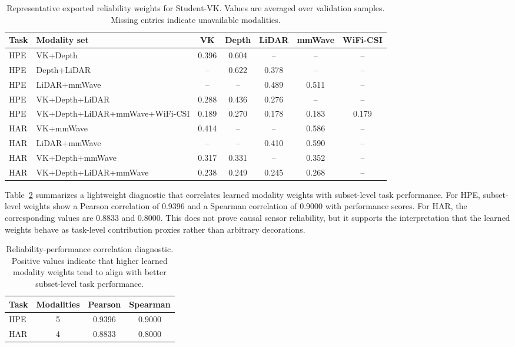 \documentclass[preprint,12pt]{elsarticle}
\begin{document}
\begin{table}[t]
\centering
\caption{Representative exported reliability weights for Student-VK. Values are averaged over validation samples. Missing entries indicate unavailable modalities.}
\label{tab:reliability_examples}
\scriptsize
\begin{adjustbox}{width=\textwidth}
\begin{tabular}{llccccc}
\toprule
Task & Modality set & VK & Depth & LiDAR & mmWave & WiFi-CSI \\
\midrule
HPE & VK+Depth & 0.396 & 0.604 & -- & -- & -- \\
HPE & Depth+LiDAR & -- & 0.622 & 0.378 & -- & -- \\
HPE & LiDAR+mmWave & -- & -- & 0.489 & 0.511 & -- \\
HPE & VK+Depth+LiDAR & 0.288 & 0.436 & 0.276 & -- & -- \\
HPE & VK+Depth+LiDAR+mmWave+WiFi-CSI & 0.189 & 0.270 & 0.178 & 0.183 & 0.179 \\
\midrule
HAR & VK+mmWave & 0.414 & -- & -- & 0.586 & -- \\
HAR & LiDAR+mmWave & -- & -- & 0.410 & 0.590 & -- \\
HAR & VK+Depth+mmWave & 0.317 & 0.331 & -- & 0.352 & -- \\
HAR & VK+Depth+LiDAR+mmWave & 0.238 & 0.249 & 0.245 & 0.268 & -- \\
\bottomrule
\end{tabular}
\end{adjustbox}
\end{table}

Table~\ref{tab:reliability_correlation} summarizes a lightweight diagnostic that correlates learned modality weights with subset-level task performance. For HPE, subset-level weights show a Pearson correlation of 0.9396 and a Spearman correlation of 0.9000 with performance scores. For HAR, the corresponding values are 0.8833 and 0.8000. This does not prove causal sensor reliability, but it supports the interpretation that the learned weights behave as task-level contribution proxies rather than arbitrary decorations.

\begin{table}[t]
\centering
\caption{Reliability-performance correlation diagnostic. Positive values indicate that higher learned modality weights tend to align with better subset-level task performance.}
\label{tab:reliability_correlation}
\begin{tabular}{lccc}
\toprule
Task & Modalities & Pearson & Spearman \\
\midrule
HPE & 5 & 0.9396 & 0.9000 \\
HAR & 4 & 0.8833 & 0.8000 \\
\bottomrule
\end{tabular}
\end{table}
\end{document}
